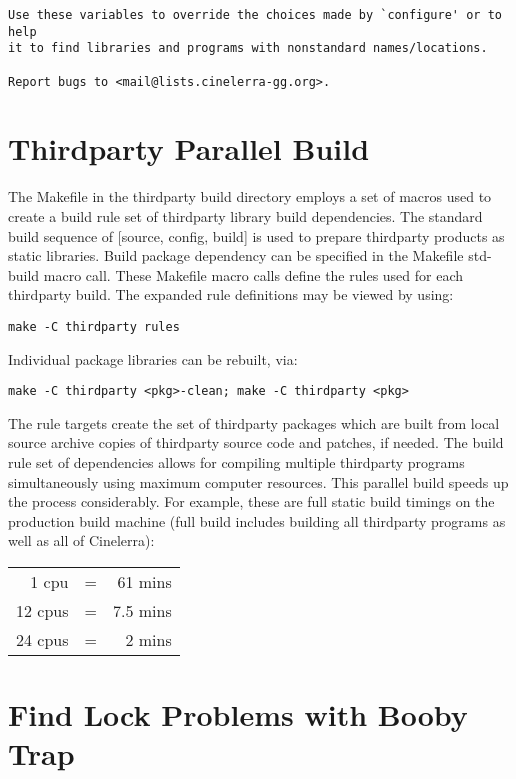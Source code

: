 \begin{verbatim}
Use these variables to override the choices made by `configure' or to help
it to find libraries and programs with nonstandard names/locations.

Report bugs to <mail@lists.cinelerra-gg.org>.

\end{verbatim}
\endgroup

\section{Thirdparty Parallel Build}
\label{sec:thirdparty_parallel_build}

The Makefile in the thirdparty build directory employs a set of macros used to create a build rule set of thirdparty library build dependencies.  The standard build sequence of [source, config, build] is used to prepare thirdparty products as static libraries.  Build package dependency can be specified in the Makefile std-build macro call.  These Makefile macro calls define the rules used for each thirdparty build.  The expanded rule definitions may be viewed by using:

\hspace{2em}\texttt{make -C thirdparty rules}

Individual package libraries can be rebuilt, via:

\hspace{2em}\texttt{make -C thirdparty <pkg>-clean;  make -C thirdparty <pkg>}

The rule targets create the set of thirdparty packages which are built from local source archive copies of thirdparty source code and patches, if needed.  The build rule set of dependencies allows for compiling multiple thirdparty programs simultaneously using maximum computer resources.  This parallel build speeds up the process considerably.  For example, these are full static build timings on the production build machine (full build includes building all thirdparty programs as well as all of Cinelerra):

\hspace{2em}
\begin{tabular}{@{}rcr}
	1 cpu & = & 61 mins\\
	12 cpus & = & 7.5 mins\\
	24 cpus & = & 2 mins\\
\end{tabular}

\section{Find Lock Problems with Booby Trap}
\label{sec:find_lock_problems_booby_trap}

